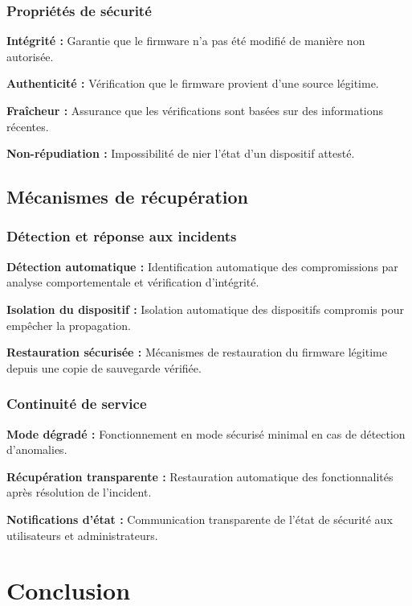 \subsubsection{Propriétés de sécurité}

\textbf{Intégrité :} Garantie que le firmware n'a pas été modifié de manière non autorisée.

\textbf{Authenticité :} Vérification que le firmware provient d'une source légitime.

\textbf{Fraîcheur :} Assurance que les vérifications sont basées sur des informations récentes.

\textbf{Non-répudiation :} Impossibilité de nier l'état d'un dispositif attesté.

\subsection{Mécanismes de récupération}

\subsubsection{Détection et réponse aux incidents}

\textbf{Détection automatique :} Identification automatique des compromissions par analyse comportementale et vérification d'intégrité.

\textbf{Isolation du dispositif :} Isolation automatique des dispositifs compromis pour empêcher la propagation.

\textbf{Restauration sécurisée :} Mécanismes de restauration du firmware légitime depuis une copie de sauvegarde vérifiée.

\subsubsection{Continuité de service}

\textbf{Mode dégradé :} Fonctionnement en mode sécurisé minimal en cas de détection d'anomalies.

\textbf{Récupération transparente :} Restauration automatique des fonctionnalités après résolution de l'incident.

\textbf{Notifications d'état :} Communication transparente de l'état de sécurité aux utilisateurs et administrateurs.

\section{Conclusion}

